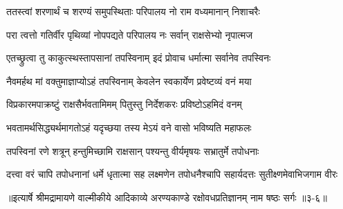 \twolineshloka
{ततस्त्वां शरणार्थं च शरण्यं समुपस्थिताः}
{परिपालय नो राम वध्यमानान् निशाचरैः} %

\twolineshloka
{परा त्वत्तो गतिर्वीर पृथिव्यां नोपपद्यते}
{परिपालय नः सर्वान् राक्षसेभ्यो नृपात्मज} %

\twolineshloka
{एतच्छ्रुत्वा तु काकुत्स्थस्तापसानां तपस्विनाम्}
{इदं प्रोवाच धर्मात्मा सर्वानेव तपस्विनः} %

\twolineshloka
{नैवमर्हथ मां वक्तुमाज्ञाप्योऽहं तपस्विनाम्}
{केवलेन स्वकार्येण प्रवेष्टव्यं वनं मया} %

\twolineshloka
{विप्रकारमपाक्रष्टुं राक्षसैर्भवतामिमम्}
{पितुस्तु निर्देशकरः प्रविष्टोऽहमिदं वनम्} %

\twolineshloka
{भवतामर्थसिद्ध्यर्थमागतोऽहं यदृच्छया}
{तस्य मेऽयं वने वासो भविष्यति महाफलः} %

\twolineshloka
{तपस्विनां रणे शत्रून् हन्तुमिच्छामि राक्षसान्}
{पश्यन्तु वीर्यमृषयः सभ्रातुर्मे तपोधनाः} %

\twolineshloka
{दत्त्वा वरं चापि तपोधनानां धर्मे धृतात्मा सह लक्ष्मणेन}
{तपोधनैश्चापि सहार्यदत्तः सुतीक्ष्णमेवाभिजगाम वीरः} %


॥इत्यार्षे श्रीमद्रामायणे वाल्मीकीये आदिकाव्ये अरण्यकाण्डे रक्षोवधप्रतिज्ञानम् नाम षष्ठः सर्गः ॥३-६॥

